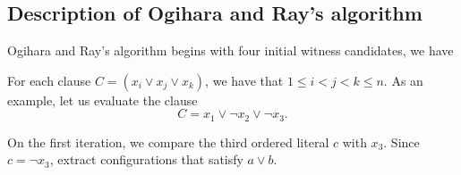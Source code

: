
\FloatBarrier

\subsection{Description of Ogihara and Ray's algorithm}
		
Ogihara and Ray's algorithm begins with four initial witness candidates, we have

\begin{center}
\end{center}

For each clause $C = (x_i \vee x_j \vee x_k)$, we have that $1 \leq i < j < k \leq n$.  As an example, let us evaluate the clause
\[
C = x_1 \vee \neg x_2 \vee \neg x_3.
\]

\noindent On the first iteration, we compare the third ordered literal $c$ with $x_3$.  Since $c = \neg x_3$, extract configurations that satisfy $a \vee b$.  

